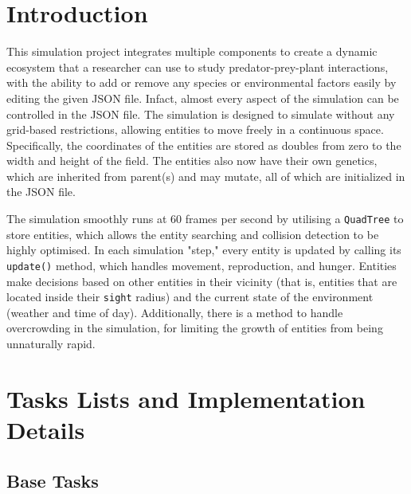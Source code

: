 \documentclass[10pt, a4paper]{scrartcl}
\begin{document}
  \begin{multicols}{2}


    \section{Introduction}

    \noindent This simulation project integrates multiple components to create a dynamic ecosystem that a researcher can use to
    study predator-prey-plant interactions, with the ability to add or remove any species or environmental factors easily
    by editing the given JSON file. Infact, almost every aspect of the simulation can be controlled in the JSON file.
    The simulation is designed to simulate without any grid-based restrictions, allowing entities to move freely in a
    continuous space. Specifically, the coordinates of the entities are stored as doubles from zero to the width and height
    of the field.
    The entities also now have their own genetics, which are inherited from parent(s) and may mutate, all of which are initialized in the JSON file.

    \noindent The simulation smoothly runs at 60 frames per second by utilising a \verb|QuadTree| to store entities, which allows the entity searching and collision detection to be highly optimised.
    In each simulation "step," every entity is updated by calling its \verb|update()| method, which handles movement, reproduction, and hunger.
    Entities make decisions based on other entities in their vicinity (that is, entities that are located inside their
    \verb|sight| radius) and the current state of the environment (weather and time of day). Additionally, there is a
    method to handle overcrowding in the simulation, for limiting the growth of entities from being unnaturally rapid.

    \section{Tasks Lists and Implementation Details}

    \subsection{Base Tasks}


\end{multicols}
\end{document}
